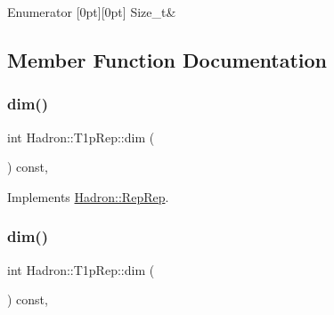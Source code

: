 \begin{DoxyEnumFields}{Enumerator}
[0pt][0pt]{}\mbox{\label{structHadron_1_1T1pRep_a24db1c512cfbbf50eee95d072b37208aace463da5e26ea39d45d01b927116be67}} 
Size\+\_\+t&\\
\hline

\end{DoxyEnumFields}


\subsection{Member Function Documentation}
\mbox{\label{structHadron_1_1T1pRep_a8701f4d6be60663f10c103c8c53a191a}} 
\subsubsection{\texorpdfstring{dim()}{dim()}\hspace{0.1cm}{\footnotesize\ttfamily [1/3]}}
{\footnotesize\ttfamily int Hadron\+::\+T1p\+Rep\+::dim (\begin{DoxyParamCaption}{ }\end{DoxyParamCaption}) const\hspace{0.3cm}{\ttfamily [inline]}, {\ttfamily [virtual]}}



Implements \mbox{\hyperlink{structHadron_1_1RepRep_a92c8802e5ed7afd7da43ccfd5b7cd92b}{Hadron\+::\+Rep\+Rep}}.

\mbox{\label{structHadron_1_1T1pRep_a8701f4d6be60663f10c103c8c53a191a}} 
\subsubsection{\texorpdfstring{dim()}{dim()}\hspace{0.1cm}{\footnotesize\ttfamily [2/3]}}
{\footnotesize\ttfamily int Hadron\+::\+T1p\+Rep\+::dim (\begin{DoxyParamCaption}{ }\end{DoxyParamCaption}) const\hspace{0.3cm}{\ttfamily [inline]}, {\ttfamily [virtual]}}




